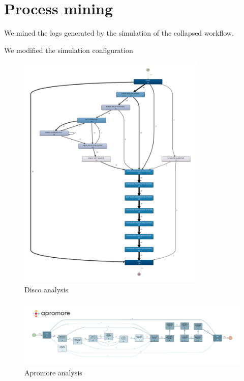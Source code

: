\section{Process mining}
\label{sec:process_mining}

We mined the logs generated by the simulation of the collapsed workflow.

We modified the simulation configuration 

\begin{figure}[H]
\centering
\includegraphics[width=0.8\textwidth]{figures/disco_map.pdf}
\caption{Disco analysis}
\label{fig:disco_analysis}
\end{figure}

\begin{figure}[H]
\centering
\includegraphics[width=\textwidth]{figures/apromore_map.pdf}
\caption{Apromore analysis}
\label{fig:apromore_analysis}
\end{figure}


